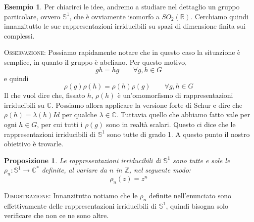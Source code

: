\documentclass[11pt]{article}
\theoremstyle{plain}
\newtheorem{prop}[thm]{Proposizione}
\theoremstyle{definition}
\newtheorem{exmp}{Esempio}[section]
\theoremstyle{remark}
\newcommand{\C}{\mathbb{C}}
\newcommand{\R}{\mathbb{R}}
\newcommand{\Z}{\mathbb{Z}}
\begin{document}
\begin{exmp}
Per chiarirci le idee, andremo a studiare nel dettaglio un gruppo particolare, ovvero $\mathbb{S}^1$, che è ovviamente isomorfo a $SO_2(\R)$. Cerchiamo quindi innanzitutto le sue rappresentazioni irriducibili su spazi di dimensione finita sui complessi. 
\end{exmp}


\textsc{Osservazione:}
Possiamo rapidamente notare che in questo caso la situazione è semplice, in quanto il gruppo è abeliano. Per questo motivo, 
\[ gh = hg \qquad \forall g,h \in G \]
e quindi 
\[ \rho(g)\rho(h) = \rho(h)\rho(g) \qquad \forall g, h \in G\]
Il che vuol dire che, fissato $h$, $\rho(h)$ è un'omomorfismo di rappresentazioni irriducibili su $\C$. Possiamo allora applicare la versione forte di Schur e dire che $\rho(h) = \lambda(h) Id$ per qualche $\lambda \in \C$. Tuttavia quello che abbiamo fatto vale per ogni $h \in G$, per cui tutti i $\rho(g) $ sono in realtà scalari. Questo ci dice che le rappresentazioni irriducibili di $\mathbb{S}^1$ sono tutte di grado 1. A questo punto il nostro obiettivo è trovarle.


\begin{prop} Le rappresentazioni irriducibili di $\mathbb{S}^1$ sono tutte e sole le $\rho_n:\mathbb{S}^1\to\C^*$ definite, al variare da $n$ in $\Z$, nel seguente modo:
\[ \rho_n(z) = z^n \]
\end{prop}


\textsc{Dimostrazione:}
Innanzitutto notiamo che le $\rho_n$ definite nell'enunciato sono effettivamente delle rappresentazioni irriducibili di $\mathbb{S}^1$, quindi bisogna solo verificare che non ce ne sono altre.
\end{document}
